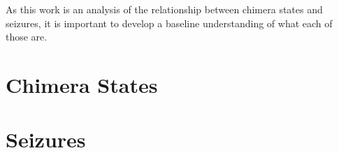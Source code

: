 As this work is an analysis of the relationship between chimera states and seizures, it is important to develop a baseline understanding of what each of those are.
\section{Chimera States}
\label{sec:intro_chimera}


\section{Seizures}
\label{sec:intro_seizures}
